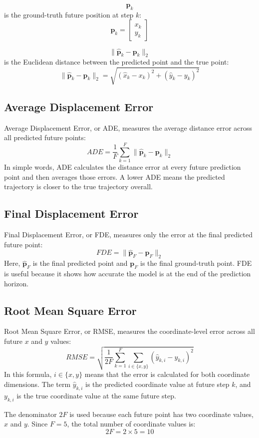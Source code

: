 \documentclass[11pt,a4paper]{article}
\begin{document}
\[
    \mathbf{p}_k
\]
is the ground-truth future position at step \(k\):
\[
    \mathbf{p}_k =
    \begin{bmatrix}
        x_k \\
        y_k
    \end{bmatrix}
\]

\[
    \|\hat{\mathbf{p}}_k - \mathbf{p}_k\|_2
\]
is the Euclidean distance between the predicted point and the true point:
\[
    \|\hat{\mathbf{p}}_k - \mathbf{p}_k\|_2
    =
    \sqrt{(\hat{x}_k - x_k)^2 + (\hat{y}_k - y_k)^2}
\]

\subsection*{Average Displacement Error}
Average Displacement Error, or ADE, measures the average distance error across
all predicted future points:
\[
    ADE =
    \frac{1}{F}
    \sum_{k=1}^{F}
    \|\hat{\mathbf{p}}_k - \mathbf{p}_k\|_2
\]
In simple words, ADE calculates the distance error at every future prediction
point and then averages those errors. A lower ADE means the predicted trajectory
is closer to the true trajectory overall.

\subsection*{Final Displacement Error}
Final Displacement Error, or FDE, measures only the error at the final predicted
future point:
\[
    FDE =
    \|\hat{\mathbf{p}}_F - \mathbf{p}_F\|_2
\]
Here, \(\hat{\mathbf{p}}_F\) is the final predicted point and
\(\mathbf{p}_F\) is the final ground-truth point. FDE is useful because it shows
how accurate the model is at the end of the prediction horizon.

\subsection*{Root Mean Square Error}
Root Mean Square Error, or RMSE, measures the coordinate-level error across all
future \(x\) and \(y\) values:
\[
    RMSE =
    \sqrt{
    \frac{1}{2F}
    \sum_{k=1}^{F}
    \sum_{i\in\{x,y\}}
    (\hat{y}_{k,i} - y_{k,i})^2
    }
\]
In this formula, \(i\in\{x,y\}\) means that the error is calculated for both
coordinate dimensions. The term \(\hat{y}_{k,i}\) is the predicted coordinate
value at future step \(k\), and \(y_{k,i}\) is the true coordinate value at the
same future step.

The denominator \(2F\) is used because each future point has two coordinate
values, \(x\) and \(y\). Since \(F=5\), the total number of coordinate values is:
\[
    2F = 2 \times 5 = 10
\]
\end{document}
